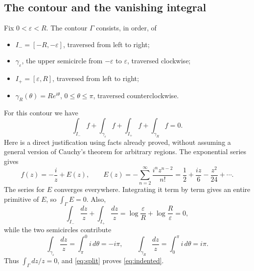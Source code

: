 \documentclass[11pt]{article}
\theoremstyle{plain}
\theoremstyle{definition}
\theoremstyle{remark}
\numberwithin{equation}{section}
\DeclareMathOperator{\Real}{Re}
\begin{document}
\subsection{The contour and the vanishing integral}
Fix $0<\varepsilon<R$. The contour $\Gamma$ consists, in order, of
\begin{itemize}
 \item $I_-=[-R,-\varepsilon]$, traversed from left to right;
 \item $\gamma_\varepsilon$, the upper semicircle from $-\varepsilon$ to
 $\varepsilon$, traversed clockwise;
 \item $I_+=[\varepsilon,R]$, traversed from left to right;
 \item $\gamma_R(\theta)=Re^{i\theta}$, $0\leq\theta\leq\pi$,
 traversed counterclockwise.
\end{itemize}
\begin{center}
\end{center}
For this contour we have
\begin{equation}\label{eq:indented}
 \int_{I_-}f+\int_{\gamma_\varepsilon}f+
 \int_{I_+}f+\int_{\gamma_R}f=0.
\end{equation}
Here is a direct justification using facts already proved, without
assuming a general version of Cauchy's theorem for arbitrary regions.
The exponential series gives
\begin{equation}\label{eq:split}
 f(z)=-\frac{i}{z}+E(z),\qquad
 E(z)=-\sum_{n=2}^{\infty}\frac{i^n z^{n-2}}{n!}
 =\frac12+\frac{iz}{6}-\frac{z^2}{24}+\cdots.
\end{equation}
The series for $E$ converges everywhere. Integrating it term by term
gives an entire primitive of $E$, so $\int_\Gamma E=0$. Also,
\[
 \int_{I_-}\frac{dz}{z}+\int_{I_+}\frac{dz}{z}
 =\log\frac{\varepsilon}{R}+\log\frac{R}{\varepsilon}=0,
\]
while the two semicircles contribute
\[
 \int_{\gamma_\varepsilon}\frac{dz}{z}=\int_\pi^0 i\,d\theta=-i\pi,
 \qquad
 \int_{\gamma_R}\frac{dz}{z}=\int_0^\pi i\,d\theta=i\pi.
\]
Thus $\int_\Gamma dz/z=0$, and \eqref{eq:split} proves
\eqref{eq:indented}.
\end{document}

